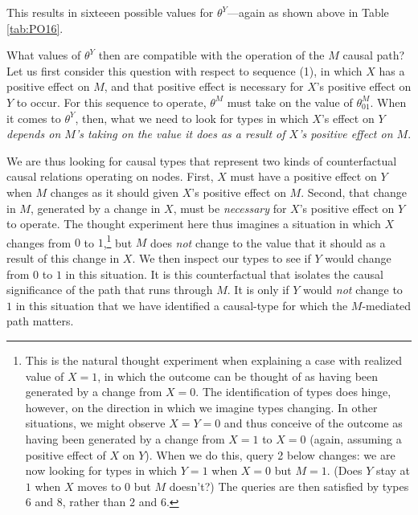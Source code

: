 \documentclass[
  12pt,
]{book}
\begin{document}
This results in sixteeen possible values for \(\theta^Y\)---again as shown above in Table \ref{tab:PO16}.

What values of \(\theta^Y\)
then are compatible with the operation of the \(M\) causal path? Let us first consider this question with respect to sequence (1), in which \(X\) has a positive effect on \(M\), and that positive effect is necessary for \(X\)'s positive effect on \(Y\) to occur. For this sequence to operate, \(\theta^M\) must take on the value of \(\theta^M_{01}\). When it comes to \(\theta^Y\), then, what we need to look for types in which \(X\)'s effect on \(Y\) \emph{depends on \(M\)'s taking on the value it does as a result of \(X\)'s positive effect on \(M\)}.

We are thus looking for causal types that represent two kinds of counterfactual causal relations operating on nodes. First, \(X\) must have a positive effect on \(Y\) when \(M\) changes as it should given \(X\)'s positive effect on \(M\). Second, that change in \(M\), generated by a change in \(X\), must be \emph{necessary} for \(X\)'s positive effect on \(Y\) to operate. The thought experiment here thus imagines a situation in which \(X\) changes from \(0\) to \(1\),\footnote{This is the natural thought experiment when explaining a case with realized value of \(X=1\), in which the outcome can be thought of as having been generated by a change from \(X=0\). The identification of types does hinge, however, on the direction in which we imagine types changing. In other situations, we might observe \(X=Y=0\) and thus conceive of the outcome as having been generated by a change from \(X=1\) to \(X=0\) (again, assuming a positive effect of \(X\) on \(Y\)). When we do this, query 2 below changes: we are now looking for types in which \(Y=1\) when \(X=0\) but \(M=1\). (Does \(Y\) stay at \(1\) when \(X\) moves to \(0\) but \(M\) doesn't?) The queries are then satisfied by types \(6\) and \(8\), rather than \(2\) and \(6\).} but \(M\) does \emph{not} change to the value that it should as a result of this change in \(X\). We then inspect our types to see if \(Y\) would change from \(0\) to \(1\) in this situation. It is this counterfactual that isolates the causal significance of the path that runs through \(M\). It is only if \(Y\) would \emph{not} change to \(1\) in this situation that we have identified a causal-type for which the \(M\)-mediated path matters.
\end{document}
